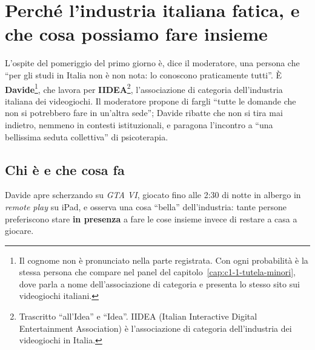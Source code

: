 
\chapter[Perché l'industria italiana fatica]{Perché l'industria italiana fatica,
e che cosa possiamo fare insieme}
\label{cap:c2-3-industria-italiana}

L'ospite del pomeriggio del primo giorno è, dice il moderatore, una persona che
``per gli studi in Italia non è non nota: lo conoscono praticamente tutti''. È
\textbf{Davide}\footnote{Il cognome non è pronunciato nella parte registrata. Con
ogni probabilità è la stessa persona che compare nel panel del
capitolo~\ref{cap:c1-1-tutela-minori}, dove parla a nome dell'associazione di
categoria e presenta lo stesso sito sui videogiochi italiani.}, che lavora per
\textbf{IIDEA}\footnote{Trascritto ``all'Idea'' e ``Idea''. IIDEA (Italian
Interactive Digital Entertainment Association) è l'associazione di categoria
dell'industria dei videogiochi in Italia.}, l'associazione di categoria
dell'industria italiana dei videogiochi. Il moderatore propone di fargli ``tutte le
domande che non si potrebbero fare in un'altra sede''; Davide ribatte che non si
tira mai indietro, nemmeno in contesti istituzionali, e paragona l'incontro a
``una bellissima seduta collettiva'' di psicoterapia.

\section{Chi è e che cosa fa}
\label{sec:c2-3-ospite}

Davide apre scherzando su \emph{GTA VI}, giocato fino alle 2:30 di notte in albergo
in \emph{remote play} su iPad, e osserva una cosa ``bella'' dell'industria: tante
persone preferiscono stare \textbf{in presenza} a fare le cose insieme invece di
restare a casa a giocare.

